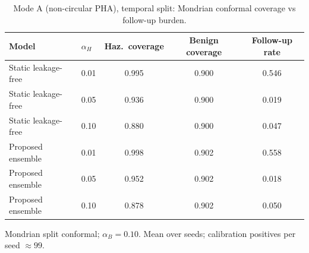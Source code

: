 \begin{table}[t]
\centering
\small
\caption{Mode A (non-circular PHA), temporal split: Mondrian conformal coverage vs follow-up burden.}
\label{tab:conf_pha_temporal}
\begin{tabular}{llccc}
\toprule
Model & $\alpha_H$ & Haz.\ coverage & Benign coverage & Follow-up rate \\
\midrule
Static leakage-free & 0.01 & 0.995 & 0.900 & 0.546 \\
Static leakage-free & 0.05 & 0.936 & 0.900 & 0.019 \\
Static leakage-free & 0.10 & 0.880 & 0.900 & 0.047 \\
\midrule
Proposed ensemble & 0.01 & 0.998 & 0.902 & 0.558 \\
Proposed ensemble & 0.05 & 0.952 & 0.902 & 0.018 \\
Proposed ensemble & 0.10 & 0.878 & 0.902 & 0.050 \\
\bottomrule
\end{tabular}
\par\vspace{2pt}\footnotesize Mondrian split conformal; $\alpha_B=0.10$. Mean over seeds; calibration positives per seed $\approx 99$.
\end{table}
